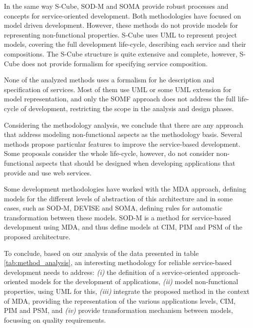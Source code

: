 In the same way S-Cube, SOD-M and SOMA provide robust processes
and concepts for service-oriented development. Both methodologies have focused on
model driven development. However, these methods do not provide models for
representing  non-functional properties. S-Cube uses UML to represent project
models, covering the full development life-cycle, describing each service and their compositions. The 
S-Cube structure is quite extensive and complete, however, S-Cube does
not provide formalism for specifying service composition.     

None of the analyzed methods uses a formalism for he description and
specification of services. Most of them use UML or some UML extension
for model representation, and only the SOMF approach does not address the full
life-cycle of development, restricting the scope in the analysis and design
phases.

Considering the methodology analysis, we conclude that there are any
approach that address modeling non-functional aspects as the methodology basis.
Several methods propose particular features to improve the service-based
development. Some proposals consider the whole life-cycle, however, do not
consider non-functional aspects that should be designed when
developing applications that provide and use web services.

Some development methodologies have worked
with the MDA approach, defining models for the different levels of abstraction
of this architecture and in some cases, such as SOD-M, DEVISE and SOMA, defining
rules for automatic transformation between these models. SOD-M is a method
for service-based development using MDA, and thus define models at CIM, PIM and
PSM of the proposed architecture. 



To conclude, based on our analysis of the data presented in table
\ref{tab:method_analysis}, an interesting methodology for reliable service-based
development needs to address: \textit{(i)} the definition of a service-oriented
approach-oriented models for the development of applications, \textit{(ii)}
model non-functional properties, using UML for this, \textit{(iii)}
integrate the proposed method in the context of MDA, providing
the representation of the various applications levels, CIM, PIM and PSM, and
\textit{(iv)} provide transformation mechanism between models, focussing on
quality requirements.



